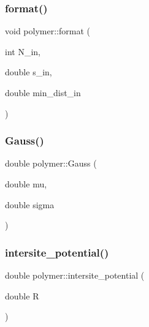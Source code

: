 \subsubsection{\texorpdfstring{format()}{format()}}
{\footnotesize\ttfamily void polymer\+::format (\begin{DoxyParamCaption}\item[{int}]{N\+\_\+in,  }\item[{double}]{s\+\_\+in,  }\item[{double}]{min\+\_\+dist\+\_\+in }\end{DoxyParamCaption})}

\hypertarget{classpolymer_ab3fd4640505e410cc7bc24fe8c981fc5}{}\label{classpolymer_ab3fd4640505e410cc7bc24fe8c981fc5} 
\subsubsection{\texorpdfstring{Gauss()}{Gauss()}}
{\footnotesize\ttfamily double polymer\+::\+Gauss (\begin{DoxyParamCaption}\item[{double}]{mu,  }\item[{double}]{sigma }\end{DoxyParamCaption})}

\hypertarget{classpolymer_a1409622014bc93fe524b0f44570a36fa}{}\label{classpolymer_a1409622014bc93fe524b0f44570a36fa} 
\subsubsection{\texorpdfstring{intersite\+\_\+potential()}{intersite\_potential()}}
{\footnotesize\ttfamily double polymer\+::intersite\+\_\+potential (\begin{DoxyParamCaption}\item[{double}]{R }\end{DoxyParamCaption})}

\hypertarget{classpolymer_a09ba10cc653467a268ab0ba8e04f930b}{}\label{classpolymer_a09ba10cc653467a268ab0ba8e04f930b} 
